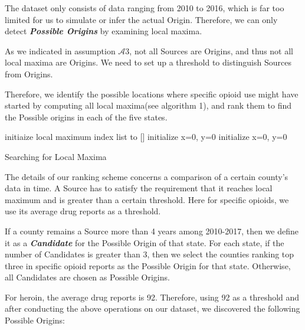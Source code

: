 The dataset only consists of data ranging from 2010 to 2016, which is far too limited for us to simulate or infer the actual Origin. Therefore, we can only detect \textbf{\itshape Possible Origins} by examining local maxima.

As we indicated in assumption $\mathcal{A}3$, not all Sources are Origins, and thus not all local maxima are Origins. We need to set up a threshold to distinguish Sources from Origins. 

Therefore, we identify the possible locations where specific opioid use might have started by computing all local maxima(see algorithm 1), and rank them to find the Possible origins in each of the five states. 

\IncMargin{1em}
\LinesNumbered
\begin{algorithm}[H]
	
	\BlankLine
	initiaize local maximum index list to []
	initialize x=0, y=0\;
	initialize x=0, y=0\;
	\caption{Searching for Local Maxima}
\end{algorithm}
\DecMargin{1em}

The details of our ranking scheme concerns a comparison of a certain county's data in time. A Source has to satisfy the requirement that it reaches local maximum and is greater than a certain threshold. Here for specific opioids, we use its average drug reports as a threshold. 

If a county remains a Source more than 4 years among 2010-2017, then we define it as a \textbf{\itshape Candidate} for the Possible Origin of that state. For each state, if the number of Candidates is greater than 3, then we select the counties ranking top three in specific opioid reports as the Possible Origin for that state. Otherwise, all Candidates are chosen as Possible Origins.

For heroin, the average drug reports is 92. Therefore, using 92 as a threshold and  after conducting the above operations on our dataset, we discovered the following Possible Origins:

